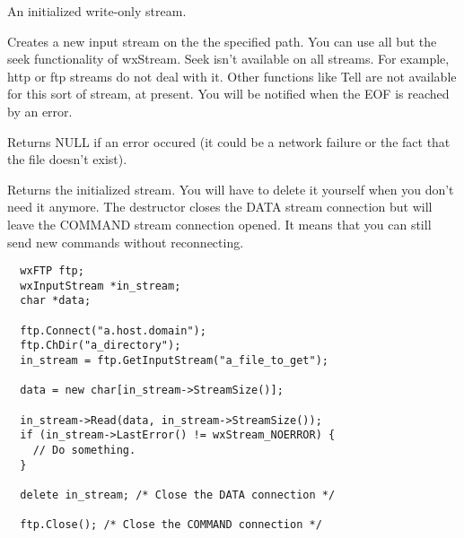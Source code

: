 An initialized write-only stream.




\label{wxftpgetinput}


Creates a new input stream on the the specified path. You can use all but the seek
functionality of wxStream. Seek isn't available on all streams. For example,
http or ftp streams do not deal with it. Other functions like Tell
are not available for this sort of stream, at present.
You will be notified when the EOF is reached by an error.


Returns NULL if an error occured (it could be a network failure or the fact
that the file doesn't exist).

Returns the initialized stream. You will have to delete it yourself when you
don't need it anymore. The destructor closes the DATA stream connection but
will leave the COMMAND stream connection opened. It means that you can still
send new commands without reconnecting.


\begin{verbatim}
  wxFTP ftp;
  wxInputStream *in_stream;
  char *data;

  ftp.Connect("a.host.domain");
  ftp.ChDir("a_directory");
  in_stream = ftp.GetInputStream("a_file_to_get");

  data = new char[in_stream->StreamSize()];

  in_stream->Read(data, in_stream->StreamSize());
  if (in_stream->LastError() != wxStream_NOERROR) {
    // Do something.
  }

  delete in_stream; /* Close the DATA connection */

  ftp.Close(); /* Close the COMMAND connection */
\end{verbatim}



